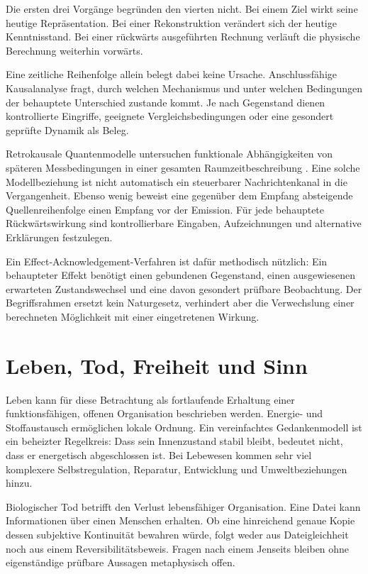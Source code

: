Die ersten drei Vorgänge begründen den vierten nicht. Bei einem Ziel wirkt seine heutige Repräsentation. Bei einer Rekonstruktion verändert sich der heutige Kenntnisstand. Bei einer rückwärts ausgeführten Rechnung verläuft die physische Berechnung weiterhin vorwärts.

Eine zeitliche Reihenfolge allein belegt dabei keine Ursache. Anschlussfähige Kausalanalyse fragt, durch welchen Mechanismus und unter welchen Bedingungen der behauptete Unterschied zustande kommt. Je nach Gegenstand dienen kontrollierte Eingriffe, geeignete Vergleichsbedingungen oder eine gesondert geprüfte Dynamik als Beleg.

Retrokausale Quantenmodelle untersuchen funktionale Abhängigkeiten von späteren Messbedingungen in einer gesamten Raumzeitbeschreibung \cite{15}. Eine solche Modellbeziehung ist nicht automatisch ein steuerbarer Nachrichtenkanal in die Vergangenheit. Ebenso wenig beweist eine gegenüber dem Empfang absteigende Quellenreihenfolge einen Empfang vor der Emission. Für jede behauptete Rückwärtswirkung sind kontrollierbare Eingaben, Aufzeichnungen und alternative Erklärungen festzulegen.

Ein Effect-Acknowledgement-Verfahren ist dafür methodisch nützlich: Ein behaupteter Effekt benötigt einen gebundenen Gegenstand, einen ausgewiesenen erwarteten Zustandswechsel und eine davon gesondert prüfbare Beobachtung. Der Begriffsrahmen ersetzt kein Naturgesetz, verhindert aber die Verwechslung einer berechneten Möglichkeit mit einer eingetretenen Wirkung.

\section{Leben, Tod, Freiheit und Sinn}\label{de:sec11}
Leben kann für diese Betrachtung als fortlaufende Erhaltung einer funktionsfähigen, offenen Organisation beschrieben werden. Energie- und Stoffaustausch ermöglichen lokale Ordnung. Ein vereinfachtes Gedankenmodell ist ein beheizter Regelkreis: Dass sein Innenzustand stabil bleibt, bedeutet nicht, dass er energetisch abgeschlossen ist. Bei Lebewesen kommen sehr viel komplexere Selbstregulation, Reparatur, Entwicklung und Umweltbeziehungen hinzu.

Biologischer Tod betrifft den Verlust lebensfähiger Organisation. Eine Datei kann Informationen über einen Menschen erhalten. Ob eine hinreichend genaue Kopie dessen subjektive Kontinuität bewahren würde, folgt weder aus Dateigleichheit noch aus einem Reversibilitätsbeweis. Fragen nach einem Jenseits bleiben ohne eigenständige prüfbare Aussagen metaphysisch offen.


